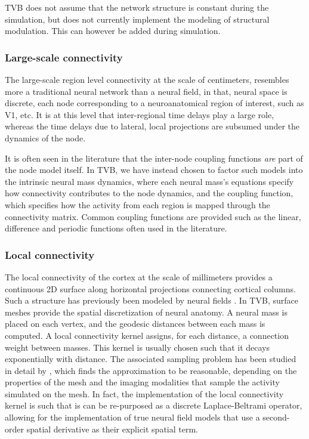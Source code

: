 \documentclass{bioinfo}
\begin{document}
TVB does not assume that the network structure is constant during the
simulation, but does not currently implement the modeling of structural
modulation. This can however be added during simulation.

\subsubsection{Large-scale connectivity}

The large-scale region level connectivity at the scale of centimeters,
resembles more a traditional neural network than a neural field, in that,
neural space is discrete,  each node corresponding to a neuroanatomical
region of interest, such as V1, etc. It is at this level that inter-regional 
time delays play a large role, whereas the time delays due to 
lateral, local projections are subsumed under the dynamics of the node.

It is often seen in the literature that the inter-node coupling functions
\textit{are} part of the node model itself. In TVB, we have instead 
chosen to factor such models into the intrinsic neural mass dynamics, where each 
neural mass's equations specify how connectivity contributes to the
node dynamics, and the coupling function, which specifies how the activity
from each region is mapped through the connectivity matrix. Common coupling 
functions are provided such as the linear, difference and periodic functions
often used in the literature.

\subsubsection{Local connectivity}

The local connectivity of the cortex at the scale of millimeters provides
a continuous 2D surface along horizontal projections connecting
cortical columns. Such a structure has previously been modeled by
neural fields \citep{Amari_1977, Jirsa1996, Jirsa_1997, Liley_1999}. 
In TVB, surface meshes provide the spatial discretization of neural anatomy. A
neural mass is placed on each vertex, and the geodesic distances between each
mass is computed. A local connectivity kernel assigns, for each distance, a
connection weight between masses. This kernel is usually chosen such that it
decays exponentially with distance.
The associated sampling problem has been studied in detail by \citep{Spiegler_2013},
which finds the approximation to be reasonable, depending on the properties
of the mesh and the imaging modalities that sample the activity simulated
on the mesh. In fact,
the implementation of the local connectivity kernel is such
that is can be re-purposed as a discrete Laplace-Beltrami operator,
allowing for the implementation of true neural field models that 
use a second-order spatial derivative as their explicit spatial term.
\end{document}
